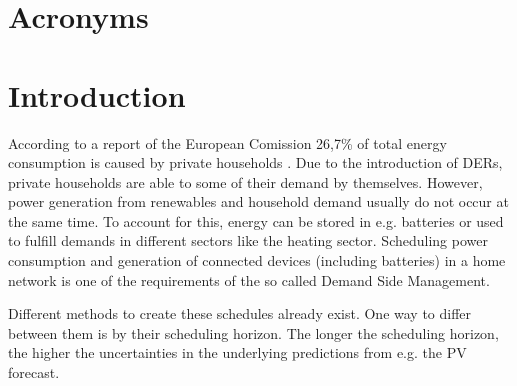 \documentclass[a4paper,12pt]{book}
\makeatletter
\def\cleardoublepage{\clearpage\if@twoside \ifodd\c@page\else%
  \hbox{}%
  \thispagestyle{empty}%
  \newpage%
  \if@twocolumn\hbox{}\newpage\fi\fi\fi}
\theoremstyle{break}
\makeatother
\begin{document}

\frontmatter

\tableofcontents

\clearpage
\listoffigures

\clearpage
\chapter*{Acronyms}
\begin{acronym}[CP-OFDMX] %
\end{acronym}


\mainmatter
\pagestyle{fancy}

\cleardoublepage
\chapter{Introduction}\label{ch/intro}
According to a report of the European Comission 26,7\% of total energy consumption is caused by private households \cite{schedulingMilp}.
Due to the introduction of \ac{DER}s, private households are able to some of their demand by themselves.
However, power generation from renewables and household demand usually do not occur at the same time. To account for this, energy can be stored in e.g. batteries or used to fulfill demands in different sectors like the heating sector.
Scheduling power consumption and generation of connected devices (including batteries) in a home network is one of the requirements of the so called Demand Side Management.

Different methods to create these schedules already exist. One way to differ between them is by their scheduling horizon. 
The longer the scheduling horizon, the higher the uncertainties in the underlying predictions from e.g. the \ac{PV} forecast\cite{strategicScheduling}.
\end{document}
